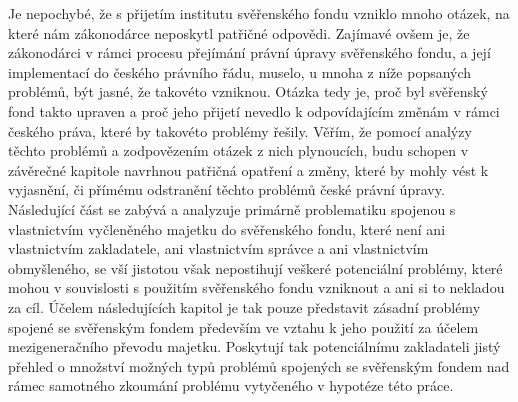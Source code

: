 \documentclass{article}
\begin{document}

Je nepochybé, že s přijetím institutu svěřenského fondu vzniklo mnoho otázek, na které nám zákonodárce neposkytl patřičné odpovědi. Zajímavé ovšem je, že zákonodárci v rámci procesu přejímání právní úpravy svěřenského fondu, a její implementací do českého právního řádu, muselo, u mnoha z níže popsaných problémů, být jasné, že takovéto vzniknou. Otázka tedy je, proč byl svěřenský fond takto upraven a proč jeho přijetí nevedlo k odpovídajícím změnám v rámci českého práva, které by takovéto problémy řešily. Věřím, že pomocí analýzy těchto problémů a zodpovězením otázek z nich plynoucích, budu schopen v závěrečné kapitole navrhnou patřičná opatření a změny, které by mohly vést k vyjasnění, či přímému odstranění těchto problémů české právní úpravy.\\

Následující část se zabývá a analyzuje primárně problematiku spojenou s vlastnictvím vyčleněného majetku do svěřenského fondu, které není ani vlastnictvím zakladatele, ani vlastnictvím správce a ani vlastnictvím obmyšleného, se vší jistotou však nepostihují veškeré potenciální problémy, které mohou v souvislosti s použitím svěřenského fondu vzniknout a ani si to nekladou za cíl. Účelem následujících kapitol je tak pouze představit zásadní problémy spojené se svěřenským fondem především ve vztahu k jeho použití za účelem mezigeneračního převodu majetku. Poskytují tak potenciálnímu zakladateli jistý přehled o množství možných typů problémů spojených se svěřenským fondem nad rámec samotného zkoumání problému vytyčeného v hypotéze této práce.\\
\end{document}
